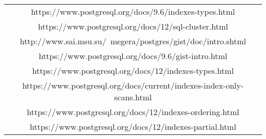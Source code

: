 \documentclass[11pt]{scrartcl}
\begin{document}
\begin{table}[H]
  \centering
  \begin{tabular}{c}
    \hline
    https://www.postgresql.org/docs/9.6/indexes-types.html \tabularnewline
    https://www.postgresql.org/docs/12/sql-cluster.html \tabularnewline
    http://www.sai.msu.su/~megera/postgres/gist/doc/intro.shtml \tabularnewline
    https://www.postgresql.org/docs/9.6/gist-intro.html \tabularnewline
    https://www.postgresql.org/docs/12/indexes-types.html \tabularnewline
    https://www.postgresql.org/docs/current/indexes-index-only-scans.html \tabularnewline
    https://www.postgresql.org/docs/12/indexes-ordering.html \tabularnewline
    https://www.postgresql.org/docs/12/indexes-partial.html \tabularnewline
    \hline
  \end{tabular}
\end{table}
\end{document}

